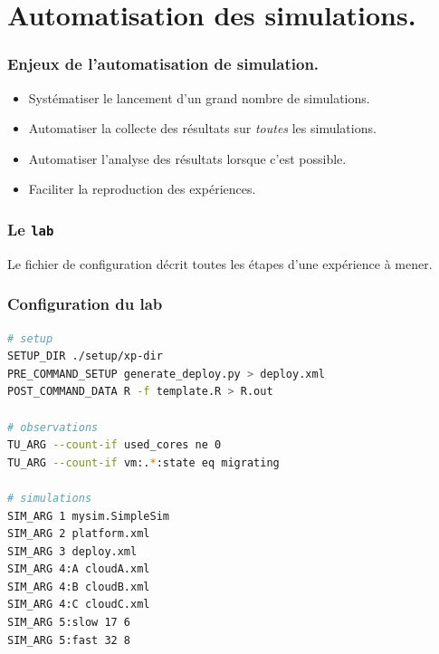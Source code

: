 \documentclass{beamer}
\newcommand{\lab}{\texttt{lab}}
\begin{document}
\section{Automatisation des simulations.}

\begin{frame}
	\frametitle{Enjeux de l'automatisation de simulation.}
	\begin{itemize}
		\item Systématiser le lancement d'un grand nombre de simulations.
		\item Automatiser la collecte des résultats sur \emph{toutes} 
			les simulations.
		\item Automatiser l'analyse des résultats lorsque c'est possible.
		\item Faciliter la reproduction des expériences. 
	\end{itemize}
\end{frame}

\begin{frame}
	\frametitle{Le \lab}
	\resizebox{\textwidth}{!}{}
	Le fichier de configuration décrit toutes les étapes d'une expérience à
	mener.
\end{frame}

\begin{frame}[fragile]
	\frametitle{Configuration du lab}
\begin{lstlisting}[language=bash,basicstyle=\tt\footnotesize,backgroundcolor=\color{gray!10},
morekeywords={SETUP_DIR,TU_ARG,PRE_COMMAND_SETUP,POST_COMMAND_DATA,SIM_ARG},
keywordstyle=\color{red!90},commentstyle=\color{blue!70}]
# setup
SETUP_DIR ./setup/xp-dir
PRE_COMMAND_SETUP generate_deploy.py > deploy.xml
POST_COMMAND_DATA R -f template.R > R.out

# observations
TU_ARG --count-if used_cores ne 0
TU_ARG --count-if vm:.*:state eq migrating

# simulations
SIM_ARG 1 mysim.SimpleSim
SIM_ARG 2 platform.xml 
SIM_ARG 3 deploy.xml
SIM_ARG 4:A cloudA.xml
SIM_ARG 4:B cloudB.xml 
SIM_ARG 4:C cloudC.xml
SIM_ARG 5:slow 17 6
SIM_ARG 5:fast 32 8
\end{lstlisting}
\end{frame}
\end{document}
